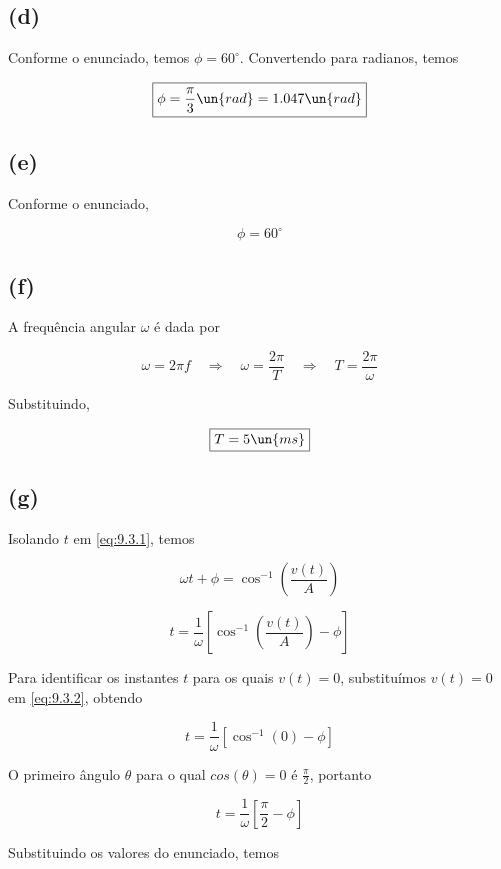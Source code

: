 \subsection*{(d)}

Conforme o enunciado, temos $\phi = 60^{\circ}$. Convertendo para radianos, temos

\[ \boxed{\phi = \frac{\pi}{3} \un{rad} = 1.047 \un{rad}}  \]

\subsection*{(e)}

Conforme o enunciado,

\[ \boxed{\phi = 60^{\circ}}  \]

\subsection*{(f)}

A frequência angular $\omega$ é dada por

\[ \omega = 2\pi f \quad \Rightarrow \quad \omega = \frac{2\pi}{T} \quad \Rightarrow \quad T = \frac{2\pi}{\omega}\]

Substituindo,

\[ \boxed{T = 5 \un{ms}}  \]

\subsection*{(g)}

Isolando $t$ em \eqref{eq:9.3.1}, temos

\[ \omega t + \phi = \cos^{-1}\left(\frac{v(t)}{A}\right) \]

\begin{equation}\label{eq:9.3.2}
    t = \frac{1}{\omega} \left[\cos^{-1}\left(\frac{v(t)}{A}\right) - \phi \right]
\end{equation}

Para identificar os instantes $t$ para os quais $v(t)=0$, substituímos $v(t)=0$ em \eqref{eq:9.3.2}, obtendo

\[  t = \frac{1}{\omega} \left[\cos^{-1}\left(0\right) - \phi \right] \]

O primeiro ângulo $\theta$ para o qual $cos(\theta) = 0$ é $\frac{\pi}{2}$, portanto  

\[  t = \frac{1}{\omega} \left[\frac{\pi}{2} - \phi \right] \]

Substituindo os valores do enunciado, temos

